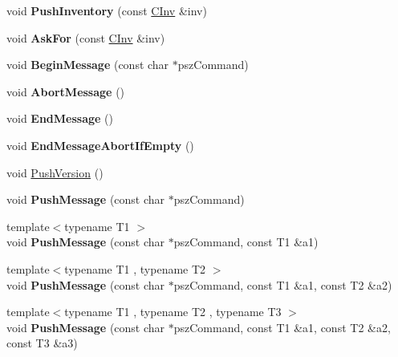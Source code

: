 \begin{DoxyCompactItemize}
void {\bfseries Push\+Inventory} (const \mbox{\hyperlink{class_c_inv}{C\+Inv}} \&inv)
\item 
\mbox{\label{class_c_node_ae0def1498409407d1612833a7d38c875}} 
void {\bfseries Ask\+For} (const \mbox{\hyperlink{class_c_inv}{C\+Inv}} \&inv)
\item 
\mbox{\label{class_c_node_afdfd046f2404877bebdf8767a80d3f0e}} 
void {\bfseries Begin\+Message} (const char $\ast$psz\+Command)
\item 
\mbox{\label{class_c_node_a450f4d94e80d97bf0527b75b96c55b2c}} 
void {\bfseries Abort\+Message} ()
\item 
\mbox{\label{class_c_node_a056be2dcf7a8eba3bb7e6d83f698f88b}} 
void {\bfseries End\+Message} ()
\item 
\mbox{\label{class_c_node_aeaf7ae545de93165ed96ac86ffcde1d6}} 
void {\bfseries End\+Message\+Abort\+If\+Empty} ()
\item 
void \mbox{\hyperlink{class_c_node_a4dbfe4f6c1fd162aaa905e4bd201d536}{Push\+Version}} ()
\item 
\mbox{\label{class_c_node_a204fda3d33404cb37698c085b1583ab2}} 
void {\bfseries Push\+Message} (const char $\ast$psz\+Command)
\item 
\mbox{\label{class_c_node_a07f897794e362a214a1d4d2aa3d68939}} 
{\footnotesize template$<$typename T1 $>$ }\\void {\bfseries Push\+Message} (const char $\ast$psz\+Command, const T1 \&a1)
\item 
\mbox{\label{class_c_node_a67b985781651b8806d7f9976f6fb85a9}} 
{\footnotesize template$<$typename T1 , typename T2 $>$ }\\void {\bfseries Push\+Message} (const char $\ast$psz\+Command, const T1 \&a1, const T2 \&a2)
\item 
\mbox{\label{class_c_node_a79355956a00c38d855b986a34e7ba444}} 
{\footnotesize template$<$typename T1 , typename T2 , typename T3 $>$ }\\void {\bfseries Push\+Message} (const char $\ast$psz\+Command, const T1 \&a1, const T2 \&a2, const T3 \&a3)

\end{DoxyCompactItemize}
